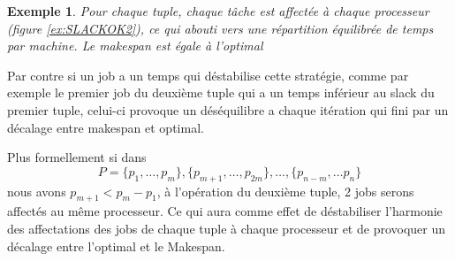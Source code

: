 \documentclass[a4paper,12pt]{report}
\theoremstyle{plain}				%
\newtheorem{example}{Exemple}
\theoremstyle{definition}				%
\newcommand{\jb}[1]{\todo[author=JB,color=orange,inline]{#1}}
\begin{document}
\begin{example}
Pour chaque tuple, chaque tâche est affectée à chaque processeur (figure \ref{ex:SLACKOK2}), ce qui abouti vers une répartition équilibrée de temps par machine. Le makespan est égale à l'optimal

\end{example}

Par contre si un job a un temps qui déstabilise cette stratégie, comme par exemple le premier job du deuxième tuple qui a un temps inférieur au slack du premier tuple, celui-ci provoque un déséquilibre a chaque itération
qui fini par un décalage entre makespan et optimal.     

Plus formellement si dans 
$$P = \{p_1, \ldots, p_m\}, \{p_{m+1}, \ldots, p_{2m}\}, \ldots, \{p_{n-m}, \ldots p_n\}$$
nous avons $p_{m+1} < p_m - p_1$, à l’opération du deuxième tuple, 2 jobs serons affectés au même processeur. Ce qui aura comme effet de déstabiliser l'harmonie des affectations des jobs de chaque tuple à chaque processeur et de provoquer un décalage entre l'optimal et le Makespan.
\end{document}
